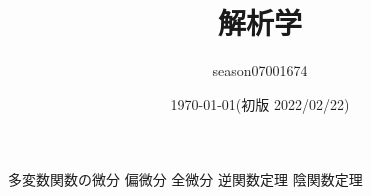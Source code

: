 \documentclass{jsarticle}
\title{解析学}
\author{season07001674}
\date{\today(初版 2022/02/22)}
\renewcommand{\(}{\left(}
\renewcommand{\)}{\right)}
\begin{document}
\maketitle
\tableofcontents






多変数関数の微分
偏微分
全微分
逆関数定理
陰関数定理
\end{document}
